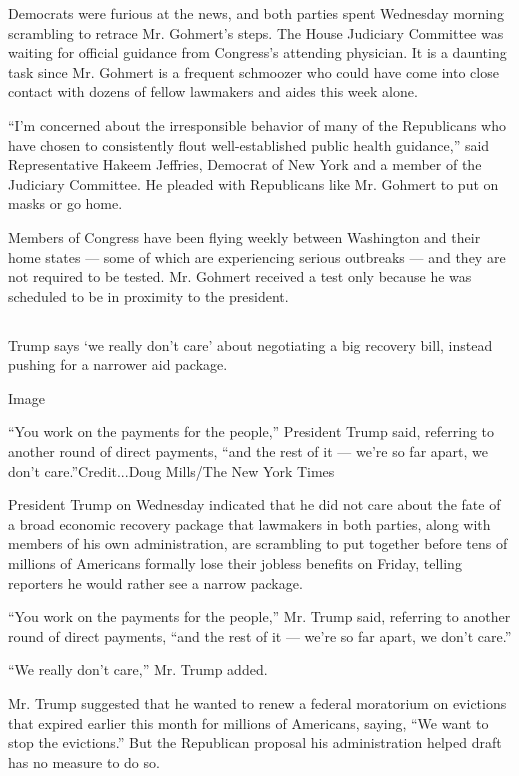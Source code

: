Democrats were furious at the news, and both parties spent Wednesday
morning scrambling to retrace Mr. Gohmert's steps. The House Judiciary
Committee was waiting for official guidance from Congress's attending
physician. It is a daunting task since Mr. Gohmert is a frequent
schmoozer who could have come into close contact with dozens of fellow
lawmakers and aides this week alone.

``I'm concerned about the irresponsible behavior of many of the
Republicans who have chosen to consistently flout well-established
public health guidance,'' said Representative Hakeem Jeffries, Democrat
of New York and a member of the Judiciary Committee. He pleaded with
Republicans like Mr. Gohmert to put on masks or go home.

Members of Congress have been flying weekly between Washington and their
home states --- some of which are experiencing serious outbreaks --- and
they are not required to be tested. Mr. Gohmert received a test only
because he was scheduled to be in proximity to the president.

\hypertarget{-2}{%
\subsection{}\label{-2}}

Trump says `we really don't care' about negotiating a big recovery bill,
instead pushing for a narrower aid package.

Image

``You work on the payments for the people,'' President Trump said,
referring to another round of direct payments, ``and the rest of it ---
we're so far apart, we don't care.''Credit...Doug Mills/The New York
Times

President Trump on Wednesday indicated that he did not care about the
fate of a broad economic recovery package that lawmakers in both
parties, along with members of his own administration, are scrambling to
put together before tens of millions of Americans formally lose their
jobless benefits on Friday, telling reporters he would rather see a
narrow package.

``You work on the payments for the people,'' Mr. Trump said, referring
to another round of direct payments, ``and the rest of it --- we're so
far apart, we don't care.''

``We really don't care,'' Mr. Trump added.

Mr. Trump suggested that he wanted to renew a federal moratorium on
evictions that expired earlier this month for millions of Americans,
saying, ``We want to stop the evictions.'' But the Republican proposal
his administration helped draft has no measure to do so.

